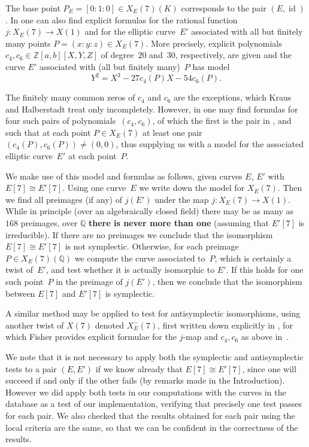 \documentclass[12pt]{amsart}
\newcommand{\Q}{\mathbb{Q}}
\newcommand{\Z}{\mathbb{Z}}
\DeclareMathOperator{\id}{id}
\numberwithin{equation}{section}
\theoremstyle{definition}
\theoremstyle{remark}
\begin{document}
The base point $P_E=[0:1:0]\in X_E(7)(K)$ corresponds to the pair
$(E,\id)$.  In \cite{Halberstadt-Kraus-XE7} one can also find explicit formulas
for the rational function $j:X_E(7)\to X(1)$ and for the elliptic curve~$E'$
associated with all 
but finitely many points $P=(x:y:z)\in
X_E(7)$. More precisely, 
explicit polynomials $c_4, c_6 \in \Z[a,b][X,Y,Z]$
of degree~$20$ and~$30$, respectively, are given and the curve $E'$ associated with (all but finitely many)~$P$ has model
\[Y^2=X^3-27c_4(P)X-54c_6(P).\]

The finitely many common zeros of $c_4$
and $c_6$ are the exceptions, which Kraus and Halberstadt treat only
incompletely.  However, in \cite{Fisher} one may find formulas for
four such pairs of polynomials~$(c_4,c_6)$, of which the first is the pair in
\cite{Halberstadt-Kraus-XE7}, and such that at each point $P\in
X_E(7)$ at least one pair $(c_4(P),c_6(P))\not=(0,0)$, thus supplying
us with a model for the associated elliptic 
curve~$E'$ at each point~$P$.

We make use of this model and formulas as follows, given 
curves $E$, $E'$ with $E[7]\cong E'[7]$.  Using one curve~$E$ we write
down the model for $X_E(7)$. 
Then we find all preimages (if any) of
$j(E')$ under the map $j:X_E(7)\to X(1)$.  While in principle (over an
algebraically closed field) there may be as many as $168$ preimages,
over $\Q$ {\bf there is never more than one} (assuming that $E'[7]$ is
irreducible). If there are no preimages we conclude that the
isomorphism $E[7]\cong E'[7]$ is not symplectic.  Otherwise, for each
preimage $P\in X_E(7)(\Q)$ we compute the curve associated to~$P$,
which is certainly a twist of~$E'$, and test whether it is actually
isomorphic to $E'$.  If this holds for one such point~$P$ in the
preimage of $j(E')$, then we conclude that the isomorphism between
$E[7]$ and $E'[7]$ is symplectic.

A similar method may be applied to test for antisymplectic
isomorphisms, using another twist of $X(7)$ denoted $X_E^-(7)$, first
written down explicitly in \cite{PSS}, for which Fisher provides
explicit formulae for the $j$-map and $c_4,c_6$ as above
in~\cite{Fisher}.

We note that it is not necessary to apply both the symplectic and
antisymplectic tests to a pair $(E,E')$ if we know already that
$E[7]\cong E'[7]$, since one will succeed if and only if the other
fails (by remarks made in the Introduction).  However we did apply both
tests in our computations with the curves in the database as a test of
our implementation, verifying that precisely one test passes for each
pair.  We also checked that the results obtained for each pair using
the local criteria are the same, so that we can be confident in the
correctness of the results.
\end{document}
